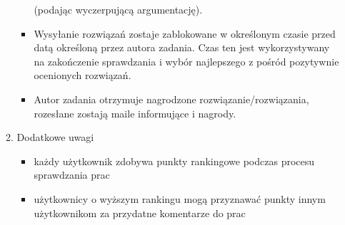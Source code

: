 \documentclass{article}
\begin{document}
\begin{enumerate}
\begin{enumerate}
\begin{itemize}
     (podając wyczerpującą argumentację).
     \item Wysyłanie rozwiązań zostaje zablokowane w określonym czasie przed datą określoną przez autora zadania. Czas ten jest wykorzystywany na zakończenie sprawdzania 
     i wybór najlepszego z pośród pozytywnie ocenionych rozwiązań.
     \item Autor zadania otrzymuje nagrodzone rozwiązanie/rozwiązania, rozesłane zostają maile informujące i nagrody.
    \end{itemize}
    \newpage
    \item Dodatkowe uwagi
    \begin{itemize}
     \item każdy użytkownik zdobywa punkty rankingowe podczas procesu sprawdzania prac
     \item użytkownicy o wyższym rankingu mogą przyznawać punkty innym użytkownikom za przydatne komentarze do prac


\end{itemize}
\end{enumerate}
\end{enumerate}
\end{document}
